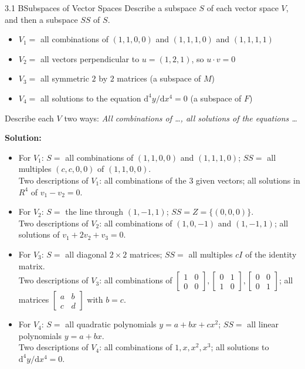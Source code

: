 \documentclass[11pt,a4paper,openany,oneside]{book}
\def\vect#1{#1}%
\def\mathbf#1{#1}%
\newcommand{\vect}[1]{\mathbf{#1}}
\newcommand{\diff}{\mathrm{d}}
\numberwithin{equation}{chapter}
\begin{document}
\begin{example}{3.1 B}{Subspaces of Vector Spaces}
Describe a subspace $\mathbf{S}$ of each vector space $\mathbf{V}$, and then a subspace $\mathbf{SS}$ of $\mathbf{S}$.
\begin{itemize}
\item $\mathbf{V}_1 =$ all combinations of $(1, 1, 0, 0)$ and $(1, 1, 1, 0)$ and $(1, 1, 1, 1)$
\item $\mathbf{V}_2 =$ all vectors perpendicular to $\vect{u} = (1, 2, 1)$, so $\vect{u} \cdot \vect{v} = 0$
\item $\mathbf{V}_3 =$ all symmetric $2$ by $2$ matrices (a subspace of $\mathbf{M}$)
\item $\mathbf{V}_4 =$ all solutions to the equation $\diff^4 y / \diff x^4 = 0$ (a subspace of $\mathbf{F}$)
\end{itemize}
Describe each $\mathbf{V}$ two ways: \emph{All combinations of \dots, all solutions of the equations \dots}
\end{example}
\textbf{Solution:}
\begin{itemize}
\item For $\mathbf{V}_1$: $\mathbf{S} =$ all combinations of $(1,1,0,0)$ and $(1,1,1,0)$; $\mathbf{SS} =$ all multiples $(c,c,0,0)$ of $(1,1,0,0)$.\\
Two descriptions of $\mathbf{V}_1$: all combinations of the 3 given vectors; all solutions in $\mathbf{R}^4$ of $v_1 - v_2 = 0$.
\item For $\mathbf{V}_2$: $\mathbf{S} =$ the line through $(1,-1,1)$; $\mathbf{SS} = \mathbf{Z} = \{(0,0,0)\}$.\\
Two descriptions of $\mathbf{V}_2$: all combinations of $(1,0,-1)$ and $(1,-1,1)$; all solutions of $v_1 + 2v_2 + v_3 = 0$.
\item For $\mathbf{V}_3$: $\mathbf{S} =$ all diagonal $2\times 2$ matrices; $\mathbf{SS} =$ all multiples $cI$ of the identity matrix.\\
Two descriptions of $\mathbf{V}_3$: all combinations of $\begin{bmatrix}1&0\\0&0\end{bmatrix}, \begin{bmatrix}0&1\\1&0\end{bmatrix}, \begin{bmatrix}0&0\\0&1\end{bmatrix}$; all matrices $\begin{bmatrix}a&b\\c&d\end{bmatrix}$ with $b = c$.
\item For $\mathbf{V}_4$: $\mathbf{S} =$ all quadratic polynomials $y = a + bx + cx^2$; $\mathbf{SS} =$ all linear polynomials $y = a + bx$.\\
Two descriptions of $\mathbf{V}_4$: all combinations of $1, x, x^2, x^3$; all solutions to $\diff^4 y / \diff x^4 = 0$.
\end{itemize}
\end{document}
